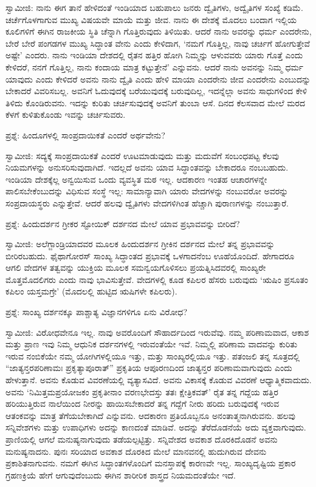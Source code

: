 ಸ್ವಾಮೀಜಿ: ನಾನು ಈಗ ತಾನೆ ಹೇಳಿದಂತೆ ಇಂಡಿಯಾದ ಬಹುಪಾಲು ಜನರು ದ್ವೈತಿಗಳು, ಅದ್ವೈತಿಗಳ ಸಂಖ್ಯೆ ಕಡಿಮೆ. ಚರ್ಚೆಗೊಳಗಾಗುವ ಮುಖ್ಯ ವಿಷಯವೇ ಮಾಯೆ ಮತ್ತು ಜೀವ. ನಾನು ಈ ದೇಶಕ್ಕೆ ಮೊದಲು ಬಂದಾಗ ಇಲ್ಲಿಯ ಕೂಲಿಗಳಿಗೆ ಈಗಿನ ರಾಜಕೀಯ ಸ್ಥಿತಿ ಚೆನ್ನಾಗಿ ಗೊತ್ತಿರುವುದು ತಿಳಿಯಿತು. ಆದರೆ ನಾನು ಅವರನ್ನು ಧರ್ಮ ಎಂದರೇನು, ಬೇರೆ ಬೇರೆ ಪಂಗಡಗಳ ಮುಖ್ಯ ಸಿದ್ಧಾಂತ ವೇನು ಎಂದು ಕೇಳಿದಾಗ, ‘ನಮಗೆ ಗೊತ್ತಿಲ್ಲ, ನಾವು ಚರ್ಚಿಗೆ ಹೋಗುತ್ತೇವೆ ಅಷ್ಟೇ’ ಎಂದರು. ನಾನು ಇಂಡಿಯಾ ದೇಶದಲ್ಲಿ ರೈತನ ಹತ್ತಿರ ಹೋಗಿ ನಿಮ್ಮನ್ನು ಆಳುವವರು ಯಾರು ಗೊತ್ತೆ ಎಂದು ಕೇಳಿದರೆ, ನನಗೆ ಗೊತ್ತಿಲ್ಲ, ನಾನು ಕಂದಾಯ ಮಾತ್ರ ಕಟ್ಟುತ್ತೇನೆ’ ಎನ್ನುವನು. ಆದರೆ ನಾನು ಅವನನ್ನು ನಿಮ್ಮ ಧರ್ಮ ಯಾವುದು ಎಂದು ಕೇಳಿದರೆ ಅವನು ನಾನು ದ್ವೈತಿ ಎಂದು ಹೇಳಿ ಮಾಯಾ ಎಂದರೇನು ಜೀವ ಎಂದರೇನು ಎಂಬುದನ್ನು ಬೇಕಾದರೆ ವಿವರಿಸಬಲ್ಲ. ಅವನಿಗೆ ಓದುವುದಕ್ಕೆ ಬರೆಯುವುದಕ್ಕೆ ಬರುವುದಿಲ್ಲ, ಇದನ್ನೆಲ್ಲಾ ಅವನು ಸಾಧುಗಳಿಂದ ಕೇಳಿ ತಿಳಿದು ಕೊಂಡಿರುವನು. ಇದನ್ನು ಕುರಿತು ಚರ್ಚಿಸುವುದಕ್ಕೆ ಅವನಿಗೆ ತುಂಬಾ ಆಸೆ. ದಿನದ ಕೆಲಸವಾದ ಮೇಲೆ ಮರದ ಕೆಳಗೆ ಕುಳಿತುಕೊಂಡು ಇವನ್ನು ಚರ್ಚಿಸುವರು.

ಪ್ರಶ್ನೆ: ಹಿಂದೂಗಳಲ್ಲಿ ಸಾಂಪ್ರದಾಯಿಕತೆ ಎಂದರೆ ಅರ್ಥವೇನು?

ಸ್ವಾಮೀಜಿ: ಸದ್ಯಕ್ಕೆ ಸಾಂಪ್ರದಾಯಿಕತೆ ಎಂದರೆ ಊಟಮಾಡುವುದು ಮತ್ತು ಮದುವೆಗೆ ಸಂಬಂಧಪಟ್ಟ ಕೆಲವು ನಿಯಮಗಳನ್ನು ಅನುಸರಿಸುವುದಾಗಿದೆ. ಇದಲ್ಲದೆ ಅವನು ಯಾವ ಸಿದ್ಧಾಂತವನ್ನು ಬೇಕಾದರೂ ನಂಬಬಹುದು. ಇಂಡಿಯಾ ದೇಶಕ್ಕೆಲ್ಲ ಅನ್ವಯಿಸುವ ಒಂದು ವ್ಯವಸ್ಥಿತ ಮಠ ಇಲ್ಲ. ಆದಕಾರಣ ಇಂತಹ ಆಚಾರಗಳನ್ನೇ ಪಾಲಿಸಬೇಕೆಂಬುದನ್ನು ವಿಧಿಸುವ ಸಂಸ್ಥೆ ಇಲ್ಲ: ಸಾಮಾನ್ಯಾವಾಗಿ ಯಾರು ವೇದಗಳನ್ನು ನಂಬುವರೋ ಅವರನ್ನು ಸಂಪ್ರದಾಯಸ್ಥರು ಎನ್ನುತ್ತೇವೆ. ಆದರೆ ಹಲವು ದ್ವೈತಿಗಳು ವೇದಗಳಿಗಿಂತ ಹೆಚ್ಚಾಗಿ ಪುರಾಣಗಳನ್ನು ನಂಬುತ್ತಾರೆ.

ಪ್ರಶ್ನೆ: ಹಿಂದುದರ್ಶನ ಗ್ರೀಕರ ಸ್ಟೋಯಿಕ್​ ದರ್ಶನದ ಮೇಲೆ ಯಾವ ಪ್ರಭಾವವನ್ನು ಬೀರಿದೆ?

ಸ್ವಾಮೀಜಿ: ಅಲೆಗ್ಜಾಂಡ್ರಿಯಾದವರ ಮೂಲಕ ಹಿಂದುದರ್ಶನ ಗ್ರೀಕಿನ ದರ್ಶನದ ಮೇಲೆ ತನ್ನ ಪ್ರಭಾವವನ್ನು ಬೀರಿರಬಹುದು. ಫೈಥಾಗೋರಸ್​ ಸಾಂಖ್ಯ ಸಿದ್ಧಾಂತದ ಪ್ರಭಾವಕ್ಕೆ ಒಳಗಾದನೆಂಬ ಊಹೆಯೊಂದಿದೆ. ಹೇಗಾದರೂ ಆಗಲಿ ವೇದಗಳ ತತ್ವವನ್ನು ಯುಕ್ತಿಯ ಮೂಲಕ ಸಮನ್ವಯಗೊಳಿಸಲು ಪ್ರಯತ್ನಿಸಿದವರಲ್ಲಿ ಸಾಂಖ್ಯರೇ ಮೊತ್ತಮೊದಲಿಗರು ಎಂದು ನಾವು ಭಾವಿಸುತ್ತೇವೆ. ವೇದಗಳಲ್ಲಿ ಕೂಡ ಕಪಿಲರ ಹೆಸರು ಬರುವುದು ‘ಋಷಿಂ ಪ್ರಸೂತಂ ಕಪಿಲಂ ಯಸ್ತಮಗ್ರೇ’ (ಮೊದಲಲ್ಲಿ ಹುಟ್ಟಿದ ಋಷಿಗಳೇ ಕಪಿಲರು).

ಪ್ರಶ್ನೆ: ಸಾಂಖ್ಯ ದರ್ಶನಕ್ಕೂ ಪಾಶ್ಚಾತ್ಯ ವಿಜ್ಞಾನಗಳಿಗೂ ಏನು ವಿರೋಧ?

ಸ್ವಾಮೀಜಿ: ವಿರೋಧವೇನೂ ಇಲ್ಲ. ನಾವು ಅವರೊಂದಿಗೆ ಸೌಹಾರ್ದದಿಂದ ಇರುವೆವು. ನಮ್ಮ ಪರಿಣಾಮವಾದ, ಆಕಾಶ ಮತ್ತು ಪ್ರಾಣ ಇವು ನಿಮ್ಮ ಆಧುನಿಕ ದರ್ಶನಗಳಲ್ಲಿ ಇರುವಂತೆಯೇ ಇವೆ. ನಿಮ್ಮಲ್ಲಿ ಪರಿಣಾಮ ವಾದವನ್ನು ಕುರಿತು ಇರುವ ನಂಬಿಕೆಯೇ ನಮ್ಮ ಯೋಗಿಗಳಲ್ಲಿಯೂ ಇತ್ತು, ಮತ್ತು ಸಾಂಖ್ಯರಲ್ಲಿಯೂ ಇತ್ತು. ಪತಂಜಲಿ ತನ್ನ ಸೂತ್ರದಲ್ಲಿ “ಜಾತ್ಯನ್ತರಪರಿಣಾಮಃ ಪ್ರಕೃತ್ಯಾಪೂರಾತ್​” ಪ್ರಕೃತಿಯ ಆಪೂರಣದಿಂದ ಜಾತ್ಯನ್ತರ ಪರಿಣಾಮವಾಗುವುದು ಎಂದು ಹೇಳುತ್ತಾನೆ. ಅವನು ಕೊಡುವ ವಿವರಣೆಯಲ್ಲಿ ವ್ಯತ್ಯಾಸವಿದೆ. ಅವನು ವಿಕಾಸಕ್ಕೆ ಕೊಡುವ ವಿವರಣೆ ಆಧ್ಯಾತ್ಮಿಕವಾದುದು. ಅವನು ‘ನಿಮಿತ್ತಮಪ್ರಯೋಜಕಂ ಪ್ರಕೃತೀನಾಂ ವರಣಭೇದಸ್ತು ತತಃ ಕ್ಷೇತ್ರಿಕವತ್​’ ರೈತ ತನ್ನ ಗದ್ದೆಯ ಹತ್ತಿರ ಹರಿಯುತ್ತಿರುವ ನಾಲೆಯಿಂದ ನೀರನ್ನು ಹಾಯಿಸಬೇಕಾದರೆ ತನ್ನ ಗದ್ದೆಗೆ ನೀರು ಹರಿದು ಬರುವುದಕ್ಕೆ ಇರುವ ಆತಂಕವನ್ನು ಮಾತ್ರ ತೆಗೆಯಬೇಕಾಗಿದೆ ಎನ್ನುವನು. ಆದಕಾರಣ ಪ್ರತಿಯೊಬ್ಬನೂ ಅನಂತಾತ್ಮನಾಗಿರುವನು. ಹಲವು ಸನ್ನಿವೇಶಗಳು ಮತ್ತು ಉಪಾಧಿಗಳು ಅದನ್ನು ಕಾಣದಂತೆ ಮಾಡಿವೆ. ಅದನ್ನು ತೆರೆದೊಡನೆಯೆ ಅದು ವ್ಯಕ್ತವಾಗುವುದು. ಪ್ರಾಣಿಯಲ್ಲಿ ಆಗಲೆ ಮನುಷ್ಯನಾಗುವುದು ತಡೆಯಲ್ಪಟ್ಟಿತ್ತು. ಸನ್ನಿವೇಶದ ಅವಕಾಶ ದೊರಕಿದೊಡನೆ ಅವನು ಮನುಷ್ಯನಾದನು. ಪುನಃ ಸರಿಯಾದ ಅವಕಾಶ ದೊರಕಿದ ಮೇಲೆ ಮಾನವನಲ್ಲಿ ಹುದುಗಿರುವ ದೇವನು ಪ್ರಕಾಶಿತನಾಗುವನು. ನಮಗೆ ಈಗಿನ ಸಿದ್ಧಾಂತಗಳೊಂದಿಗೆ ಮನಸ್ತಾಪಕ್ಕೆ ಕಾರಣವೇ ಇಲ್ಲ. ಸಾಂಖ್ಯದೃಷ್ಟಿಯ ಪ್ರಕಾರ ಗ್ರಹಣಕ್ರಿಯೆ ಹೇಗೆ ಆಗುವುದೆಂಬುದು ಈಗಿನ ಶಾರೀರಿಕ ಶಾಸ್ತ್ರದ ನಿಯಮದಂತೆಯೇ ಇದೆ.

